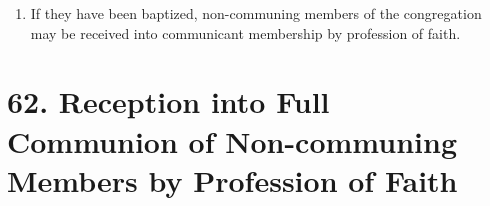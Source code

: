 \documentclass[
]{book}
\providecommand{\tightlist}{%
  \setlength{\itemsep}{0pt}\setlength{\parskip}{0pt}}
\begin{document}
\begin{enumerate}
\def\labelenumi{\arabic{enumi}.}
\setcounter{enumi}{5}
\tightlist
\item
  If they have been baptized, non-communing members of the congregation may be received into communicant membership by profession of faith.
\end{enumerate}

\hypertarget{reception-into-full-communion-of-non-communing-members-by-profession-of-faith}{%
\section*{62. Reception into Full Communion of Non-communing Members by Profession of Faith}\label{reception-into-full-communion-of-non-communing-members-by-profession-of-faith}}

\protect\hypertarget{chapter-slug-62-reception-into-full-communion-of-non-communing-members-by-profession-of-faith}{\href{}{}}
\end{document}
